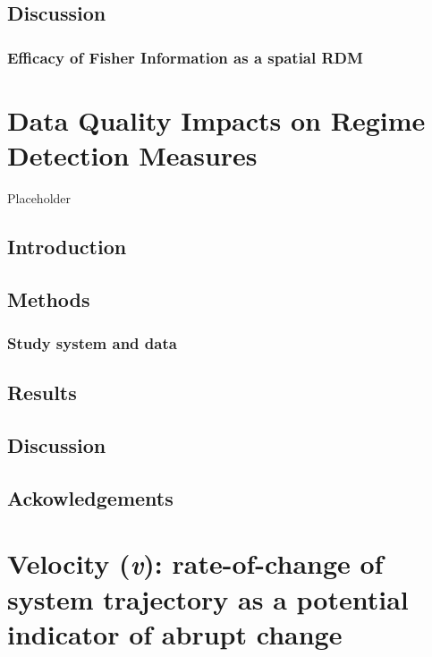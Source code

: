 \documentclass[12pt,twoside,openany]{reedthesis}
\begin{document}
\section{Discussion}\label{discussion-1}

\subsection{Efficacy of Fisher Information as a spatial
RDM}\label{efficacy-of-fisher-information-as-a-spatial-rdm}

\chapter{Data Quality Impacts on Regime Detection
Measures}\label{resampling}

Placeholder

\section{Introduction}\label{introduction-3}

\section{Methods}\label{methods-1}

\subsection{Study system and data}\label{study-system-and-data}

\section{Results}\label{results-2}

\section{Discussion}\label{discussion-2}

\section{Ackowledgements}\label{ackowledgements}

\chapter{\texorpdfstring{Velocity (\emph{v}): rate-of-change of system
trajectory as a potential indicator of abrupt
change}{Velocity (v): rate-of-change of system trajectory as a potential indicator of abrupt change}}\label{velocity}
\end{document}
